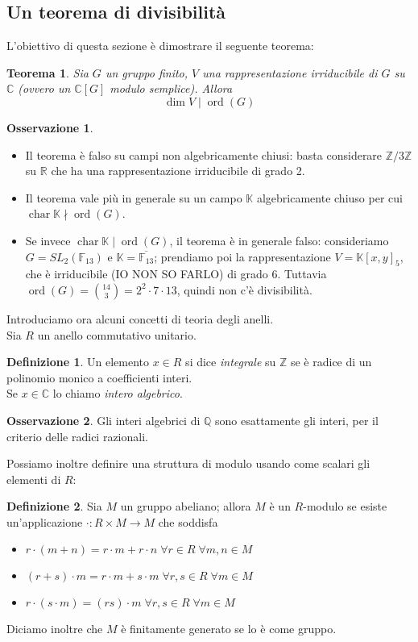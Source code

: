 \documentclass[11pt]{article}
\theoremstyle{plain}
\newtheorem{thm}{Teorema}[section]
\theoremstyle{definition}
\newtheorem{defn}{Definizione}[section]
\newtheorem*{rem}{Osservazione}
\theoremstyle{remark}
\newcommand{\C}{\mathbb{C}}
\newcommand{\R}{\mathbb{R}}
\newcommand{\K}{\mathbb{K}}
\newcommand{\Q}{\mathbb{Q}}
\newcommand{\Z}{\mathbb{Z}}
\DeclareMathOperator{\Char}{char}
\DeclareMathOperator{\ord}{ord}
\begin{document}
\subsection{Un teorema di divisibilità}
  L'obiettivo di questa sezione è dimostrare il seguente teorema:
  \begin{thm}\label{dim_mid_ordine}
    Sia $G$ un gruppo finito, $V$ una rappresentazione irriducibile di $G$ su $\C$ (ovvero un $\C[G]$ modulo semplice). Allora $$\dim V\mid  \ord(G)$$
  \end{thm}
  \begin{rem}$ $
   \begin{itemize}
    \item Il teorema è falso su campi non algebricamente chiusi: basta considerare $\Z/3\Z$ su $\R$ che ha una rappresentazione irriducibile di grado 2.
    \item Il teorema vale più in generale su un campo $\K$ algebricamente chiuso per cui $\Char \K \nmid \ord(G)$.
    \item Se invece $\Char \K\mid \ord(G)$, il teorema è in generale falso: consideriamo $G=SL_2(\mathbb F_{13})$ e $\K=\overline{\mathbb F_{13}}$; prendiamo poi la rappresentazione $V=\K[x,y]_5$, che è irriducibile (IO NON SO FARLO) di grado $6$. Tuttavia $\ord(G)=\binom{14}{3}=2^2\cdot7\cdot13$, quindi non c'è divisibilità.
   \end{itemize}
  \end{rem}
  Introduciamo ora alcuni concetti di teoria degli anelli.\\
  Sia $R$ un anello commutativo unitario.\\
  \begin{defn}
    Un elemento $x\in R$ si dice \textit{integrale} su $\Z$ se è radice di un polinomio monico a coefficienti interi.\\
    Se $x\in\C$ lo chiamo \textit{intero algebrico}.
  \end{defn}
  \begin{rem}\label{int_alg_raz}
   Gli interi algebrici di $\Q$ sono esattamente gli interi, per il criterio delle radici razionali.
  \end{rem}
  Possiamo inoltre definire una struttura di modulo usando come scalari gli elementi di $R$:
  \begin{defn}
   Sia $M$ un gruppo abeliano; allora $M$ è un $R$-modulo se esiste un'applicazione $\cdot:R\times M\to M$ che soddisfa
   \begin{itemize}
    \item $r\cdot(m+n)=r\cdot m+r\cdot n\;\forall r\in R\;\forall m,n\in M$
    \item $(r+s)\cdot m=r\cdot m+s\cdot m\;\forall r,s\in R\;\forall m\in M$
    \item $r\cdot(s\cdot m)=(rs)\cdot m\;\forall r,s\in R\;\forall m\in M$
   \end{itemize}
   Diciamo inoltre che $M$ è finitamente generato se lo è come gruppo.
  \end{defn}
\end{document}
